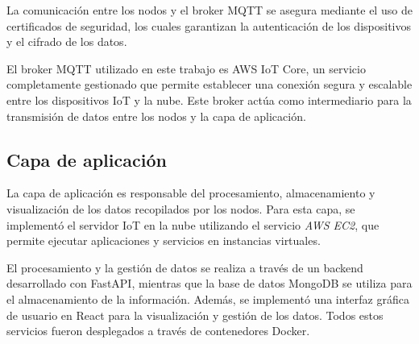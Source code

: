La comunicación entre los nodos y el broker MQTT se asegura mediante el uso de
certificados de seguridad, los cuales garantizan la autenticación de los
dispositivos y el cifrado de los datos.

El broker MQTT utilizado en este trabajo es AWS IoT Core, un servicio
completamente gestionado que permite establecer una conexión segura y escalable
entre los dispositivos IoT y la nube. Este broker actúa como intermediario para
la transmisión de datos entre los nodos y la capa de aplicación.

\subsection{Capa de aplicación}

La capa de aplicación es responsable del procesamiento, almacenamiento y
visualización de los datos recopilados por los nodos. Para esta capa, se
implementó el servidor IoT en la nube utilizando el servicio \textit{AWS EC2},
que permite ejecutar aplicaciones y servicios en instancias virtuales.

El procesamiento y la gestión de datos se realiza a través de un backend
desarrollado con FastAPI, mientras que la base de datos MongoDB se utiliza para
el almacenamiento de la información. Además, se implementó una interfaz gráfica
de usuario en React para la visualización y gestión de los datos. Todos estos
servicios fueron desplegados a través de contenedores Docker.




